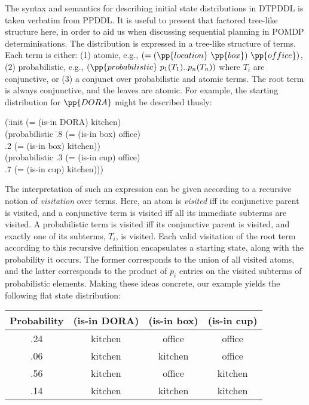 The syntax and semantics for describing initial state distributions in
DTPDDL is taken verbatim from PPDDL. It is useful to present that
factored tree-like structure here, in order to aid us when discussing
sequential planning in POMDP determinisations. The distribution is
expressed in a tree-like structure of terms. Each term is either: (1)
atomic, e.g., $(=(\pp{location}~\pp{box})~\pp{office})$, (2)
probabilistic, e.g., $(\pp{probabilistic}~p_1 (T_1) .. p_n (T_n))$
where $T_i$ are conjunctive, or (3) a conjunct over probabilistic and
atomic terms. The root term is always conjunctive, and the leaves are
atomic. For example, the starting distribution for $\pp{DORA}$ might
be described thusly:

\small
\begin{tabtt}
(\=:init (= (is-in DORA) kitchen) \+ \\
       (probabilistic \=.8 (= (is-in box) office)  \\
		      \>.2 (= (is-in box) kitchen)) \\
       (probabilistic .3 (= (is-in cup) office)  \\
		      \>.7 (= (is-in cup) kitchen))) \\
\end{tabtt}
\normalsize


\noindent The interpretation of such an expression can be given
according to a recursive notion of {\em visitation} over terms. Here,
an atom is {\em visited} iff its conjunctive parent is visited, and a
conjunctive term is visited iff all its immediate subterms are
visited. A probabilistic term is visited iff its conjunctive parent is
visited, and exactly one of its subterms, $T_i$, is visited. Each
valid visitation of the root term according to this recursive
definition encapsulates a starting state, along with the probability
it occurs. The former corresponds to the union of all visited atoms,
and the latter corresponds to the product of $p_i$ entries on the
visited subterms of probabilistic elements. Making these ideas
concrete, our example yields the following flat state distribution:


\small
\begin{tabular}{cccc}
\hline
Probability & (is-in DORA)  & (is-in box)  & (is-in cup) \\
\hline
.24 & kitchen & office & office \\
.06 & kitchen & kitchen & office \\
.56 & kitchen & office & kitchen \\
.14 & kitchen & kitchen & kitchen \\
\hline
\end{tabular}
\normalsize
